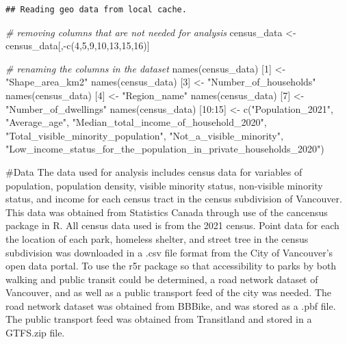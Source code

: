 \documentclass[
]{article}
\newenvironment{Shaded}{\begin{snugshade}}{\end{snugshade}}
\newcommand{\CommentTok}[1]{\textcolor[rgb]{0.56,0.35,0.01}{\textit{#1}}}
\newcommand{\DecValTok}[1]{\textcolor[rgb]{0.00,0.00,0.81}{#1}}
\newcommand{\FunctionTok}[1]{\textcolor[rgb]{0.00,0.00,0.00}{#1}}
\newcommand{\NormalTok}[1]{#1}
\newcommand{\OtherTok}[1]{\textcolor[rgb]{0.56,0.35,0.01}{#1}}
\newcommand{\SpecialCharTok}[1]{\textcolor[rgb]{0.00,0.00,0.00}{#1}}
\newcommand{\StringTok}[1]{\textcolor[rgb]{0.31,0.60,0.02}{#1}}
\begin{document}
\begin{verbatim}
## Reading geo data from local cache.
\end{verbatim}

\begin{Shaded}
\begin{Highlighting}[]
\CommentTok{\# removing columns that are not needed for analysis}
\NormalTok{census\_data }\OtherTok{\textless{}{-}}\NormalTok{ census\_data[,}\SpecialCharTok{{-}}\FunctionTok{c}\NormalTok{(}\DecValTok{4}\NormalTok{,}\DecValTok{5}\NormalTok{,}\DecValTok{9}\NormalTok{,}\DecValTok{10}\NormalTok{,}\DecValTok{13}\NormalTok{,}\DecValTok{15}\NormalTok{,}\DecValTok{16}\NormalTok{)]}
\end{Highlighting}
\end{Shaded}

\begin{Shaded}
\begin{Highlighting}[]
\CommentTok{\# renaming the columns in the dataset}
\FunctionTok{names}\NormalTok{(census\_data) [}\DecValTok{1}\NormalTok{] }\OtherTok{\textless{}{-}} \StringTok{"Shape\_area\_km2"}
\FunctionTok{names}\NormalTok{(census\_data) [}\DecValTok{3}\NormalTok{] }\OtherTok{\textless{}{-}} \StringTok{"Number\_of\_households"}
\FunctionTok{names}\NormalTok{(census\_data) [}\DecValTok{4}\NormalTok{] }\OtherTok{\textless{}{-}} \StringTok{"Region\_name"}
\FunctionTok{names}\NormalTok{(census\_data) [}\DecValTok{7}\NormalTok{] }\OtherTok{\textless{}{-}} \StringTok{"Number\_of\_dwellings"}
\FunctionTok{names}\NormalTok{(census\_data) [}\DecValTok{10}\SpecialCharTok{:}\DecValTok{15}\NormalTok{] }\OtherTok{\textless{}{-}} \FunctionTok{c}\NormalTok{(}\StringTok{"Population\_2021"}\NormalTok{, }\StringTok{"Average\_age"}\NormalTok{, }\StringTok{"Median\_total\_income\_of\_household\_2020"}\NormalTok{, }\StringTok{"Total\_visible\_minority\_population"}\NormalTok{, }\StringTok{"Not\_a\_visible\_minority"}\NormalTok{, }\StringTok{"Low\_income\_status\_for\_the\_population\_in\_private\_households\_2020"}\NormalTok{)}
\end{Highlighting}
\end{Shaded}

\#Data The data used for analysis includes census data for variables of
population, population density, visible minority status, non-visible
minority status, and income for each census tract in the census
subdivision of Vancouver. This data was obtained from Statistics Canada
through use of the cancensus package in R. All census data used is from
the 2021 census. Point data for each the location of each park, homeless
shelter, and street tree in the census subdivision was downloaded in a
.csv file format from the City of Vancouver's open data portal. To use
the r5r package so that accessibility to parks by both walking and
public transit could be determined, a road network dataset of Vancouver,
and as well as a public transport feed of the city was needed. The road
network dataset was obtained from BBBike, and was stored as a .pbf file.
The public transport feed was obtained from Transitland and stored in a
GTFS.zip file.
\end{document}
